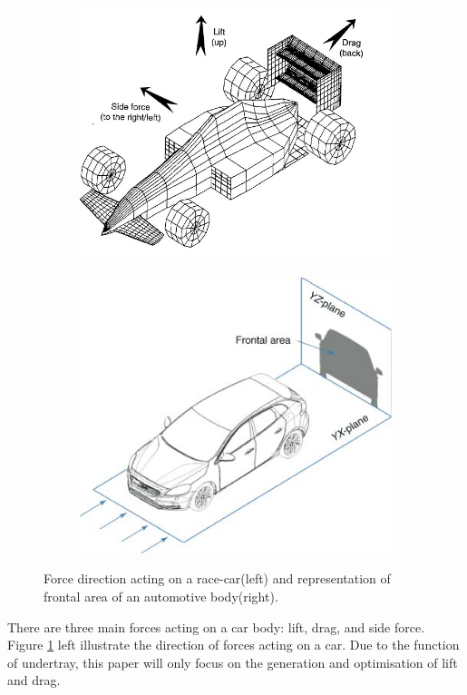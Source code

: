 \begin{figure}[!ht]
\begin{center}
%    
  \begin{subfigure}[b]{0.4\textwidth}
    \includegraphics[scale=0.4]{Figures/race_car_forces.jpg}
  \end{subfigure}
  \begin{subfigure}[b]{0.4\textwidth}
    \includegraphics[scale=0.8]{Figures/frontal_area.jpg}
  \end{subfigure}
%  
  \caption{Force direction acting on a race-car(left) and representation of frontal area of an automotive body(right)\cite{Sebben2014FundamentalsDesign}.}
    \label{fig:Force direction and frontal area}
\end{center}
\end{figure}
\noindent There are three main forces acting on a car body: lift, drag, and side force. Figure \ref{fig:Force direction and frontal area} left illustrate the direction of forces acting on a car. Due to the function of undertray, this paper will only focus on the generation and optimisation of lift and drag.

